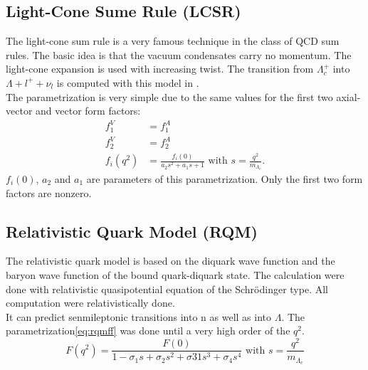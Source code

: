 \subsection{Light-Cone Sume Rule (LCSR)}
The light-cone sum rule is a very famous technique in the class of QCD sum 
rules{\cite{LCSR}}. The basic idea is that the vacuum condensates carry no momentum. 
The light-cone expansion is used with increasing twist. The transition from 
\(\Lambda_c^+\) into \(\Lambda + l^+ + \nu_l\) is computed with this model in
{\cite{LCSR}}.\\
The parametrization is very simple due to  the same values for the 
first two axial-vector and vector form factors:
\begin{align}
  f^V_1 & = f^A_1 \nonumber \\
  f^V_2 & = f^A_2 \nonumber \\
  f_i(q^2) & = \frac{f_i(0)}{a_2 s^2 + a_1 s + 1 } \text{ with } s = \frac{q^2}{m_{\Lambda_c}}. \label{eq:lcsrff}
\end{align}
\(f_i(0)\), \(a_2\) and \(a_1\) are parameters of this parametrization. Only the 
first two form factors are nonzero.

\subsection{Relativistic Quark Model (RQM)}
The relativistic quark model{\cite{RQM}} is based on the diquark wave function 
and the baryon wave function of the bound quark-diquark state. The calculation 
were done with relativistic quasipotential equation of the Schr\"{o}dinger type.
All computation were relativistically done.\\
It can predict senmileptonic transitions into n as well as into \(\Lambda\).
The parametrization{\eqref{eq:rqmff}} was done until a very high order of the 
\(q^2\).
\begin{equation}
  F(q^2) = \frac{F(0)}{1 - \sigma_1 s + \sigma_2 s^2 + \sigma31 s^3 + \sigma_4 s^4} 
  \text{ with } s = \frac{q^2}{m_{\Lambda_c}} \label{eq:rqmff}
\end{equation}

